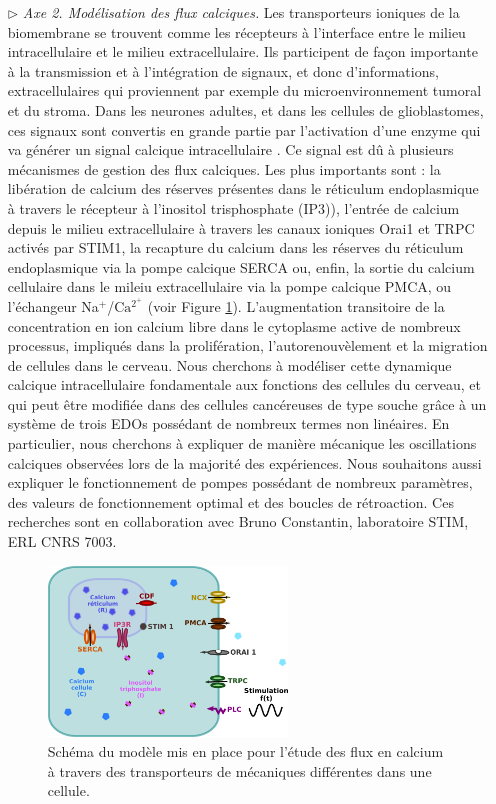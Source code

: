 \documentclass[a4paper, 12pt, twoside, openright]{article}
\begin{document}
\begin{itemize}
\begin{itemize}
\item[$\triangleright$]\textit{Axe 2. Modélisation des flux calciques.} Les transporteurs ioniques de la biomembrane se trouvent comme les récepteurs à l'interface entre le milieu intracellulaire et le milieu extracellulaire. Ils participent de façon importante à la transmission et à l'intégration de signaux, et donc d'informations, extracellulaires qui proviennent par exemple du microenvironnement tumoral et du stroma. Dans les neurones adultes, et dans les cellules de glioblastomes, ces signaux sont convertis en grande partie par l'activation d'une enzyme qui va générer un signal calcique intracellulaire \cite{Domenichini2018, Terrie2019}. Ce signal est dû à plusieurs mécanismes de gestion des flux calciques. Les plus importants sont : la libération de calcium des réserves présentes dans le réticulum endoplasmique à travers le récepteur à l'inositol trisphosphate (IP$\text{3}$)), l'entrée de calcium depuis le milieu extracellulaire à travers les canaux ioniques Orai1 et TRPC activés par STIM1, la recapture du calcium dans les réserves du réticulum endoplasmique via la pompe calcique SERCA ou, enfin, la sortie du calcium cellulaire dans le mileiu extracellulaire via la pompe calcique PMCA, ou l'échangeur Na$^+$/C$\text{a}^{2^+}$ (voir Figure \ref{Calcium}).  L'augmentation transitoire de la concentration en ion calcium libre dans le cytoplasme active de nombreux processus, impliqués dans la prolifération, l'autorenouvèlement et la migration de cellules dans le cerveau. Nous cherchons à modéliser cette dynamique calcique intracellulaire fondamentale aux fonctions des cellules du cerveau, et qui peut être modifiée dans des cellules cancéreuses de type souche \cite{Terrie2019} grâce à un système de trois EDOs possédant de nombreux termes non linéaires. En particulier, nous cherchons à expliquer de manière mécanique les oscillations calciques observées lors de la majorité des expériences. Nous souhaitons aussi expliquer le fonctionnement de pompes possédant de nombreux paramètres, des valeurs de fonctionnement optimal et des boucles de rétroaction. Ces recherches sont en collaboration avec Bruno Constantin, laboratoire STIM, ERL CNRS 7003.

 \begin{figure}[!htbp]
\centering
\includegraphics[width=0.6\textwidth]{calcium.png}
\caption{Schéma du modèle mis en place pour l'étude des flux en calcium à travers des transporteurs de mécaniques différentes dans une cellule.}\label{Calcium}
\end{figure}


\end{itemize}
\end{itemize}
\end{document}
